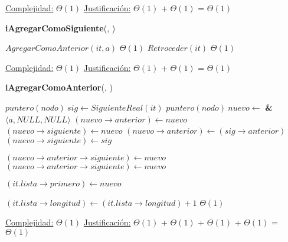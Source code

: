 \begin{Algoritmos}
\begin{algorithm}[H]
\begin{algorithmic}[1]
			\medskip
			\Statex \underline{Complejidad:} $\Theta(1)$
			\Statex \underline{Justificación:} $\Theta(1)$ + $\Theta(1)$ = $\Theta(1)$
    	\end{algorithmic}
\end{algorithm}

\begin{algorithm}[H]
	\begin{algorithmic}[1]
		\State \textbf{iAgregarComoSiguiente}(, )
		
			\State $AgregarComoAnterior(it, a)$		\Comment $\Theta(1)$
			\State $Retroceder(it)$	\Comment $\Theta(1)$

			\medskip
			\Statex \underline{Complejidad:} $\Theta(1)$
			\Statex \underline{Justificación:} $\Theta(1)$ + $\Theta(1)$ = $\Theta(1)$
    	\end{algorithmic}
\end{algorithm}
	
\begin{algorithm}[H]
	\begin{algorithmic}[1]
		\State \textbf{iAgregarComoAnterior}(, )
		
			\State $puntero(nodo) \ sig \gets SiguienteReal(it)$
			\State $puntero(nodo) \ nuevo \gets $ \textbf{\&} $\langle a, NULL, NULL \rangle$ 
				\State $(nuevo\rightarrow anterior) \gets nuevo$
				\State $(nuevo\rightarrow siguiente) \gets nuevo$
			\Else
				\State $(nuevo\rightarrow anterior) \gets (sig\rightarrow anterior)$
				\State $(nuevo\rightarrow siguiente) \gets sig$
			\EndIf
			
			\State $(nuevo\rightarrow anterior\rightarrow siguiente) \gets nuevo$ 
			\State $(nuevo\rightarrow anterior\rightarrow siguiente) \gets nuevo$ 
			
				\State $(it.lista\rightarrow primero) \gets nuevo$
			\EndIf
			
			\State $(it.lista\rightarrow longitud) \gets (it.lista\rightarrow longitud) + 1$	\Comment $\Theta(1)$

			\medskip
			\Statex \underline{Complejidad:} $\Theta(1)$
			\Statex \underline{Justificación:} $\Theta(1)$ + $\Theta(1)$ + $\Theta(1)$ +  $\Theta(1)$ =  $\Theta(1)$
    	\end{algorithmic}
\end{algorithm}
	

\end{Algoritmos}
